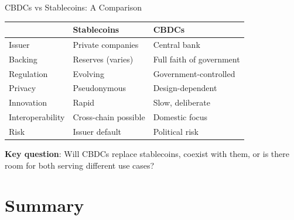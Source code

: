 \documentclass[10pt]{beamer}
\begin{document}
\begin{frame}{CBDCs vs Stablecoins: A Comparison}
  \begin{center}
  \begin{tabular}{lll}
    \toprule
    & \textbf{Stablecoins} & \textbf{CBDCs} \\
    \midrule
    Issuer & Private companies & Central bank \\
    Backing & Reserves (varies) & Full faith of government \\
    Regulation & Evolving & Government-controlled \\
    Privacy & Pseudonymous & Design-dependent \\
    Innovation & Rapid & Slow, deliberate \\
    Interoperability & Cross-chain possible & Domestic focus \\
    Risk & Issuer default & Political risk \\
    \bottomrule
  \end{tabular}
  \end{center}
  
  \vspace{1em}
  \textbf{Key question}: Will CBDCs replace stablecoins, coexist with them, or is there room for both serving different use cases?
\end{frame}

\section{Summary}
\end{document}
